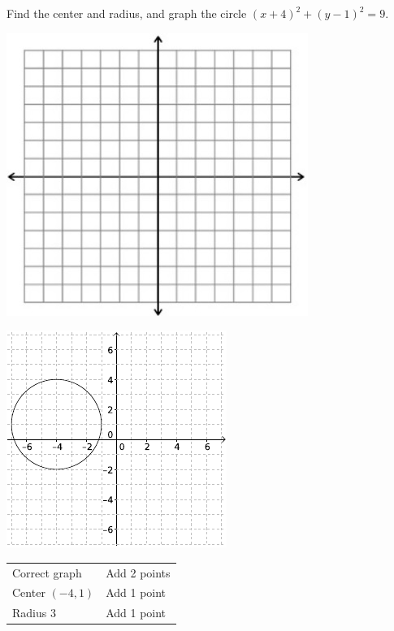 {
	Find the center and radius, and graph the circle $(x+4)^2+(y-1)^2=9$.\begin{onlyproblem}\begin{center}\includegraphics{fig-graphpaper.png}\end{center}\end{onlyproblem} \begin{onlysolution}\begin{center}\includegraphics{fig100-20-a-answer}\end{center}\end{onlysolution}
}
{
	\begin{tabular}{l l}
	Correct graph & Add 2 points\\
	Center $(-4, 1)$ & Add 1 point \\
	Radius $3$ & Add 1 point
	\end{tabular}
}

